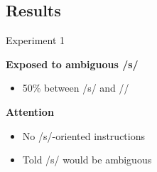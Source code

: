 \documentclass{beamer}
\begin{document}
\subsection{Results}

\begin{frame}{Experiment 1}

\begin{minipage}{0.45\textwidth}
\textbf{Exposed to ambiguous /s/}
\begin{itemize}
\item 50\% between /s/ and /\textesh/
\end{itemize}

\textbf{Attention}
\begin{itemize}
\item No /s/-oriented instructions
\item Told /s/ would be ambiguous
\end{itemize}


\end{minipage}
\end{frame}
\end{document}
